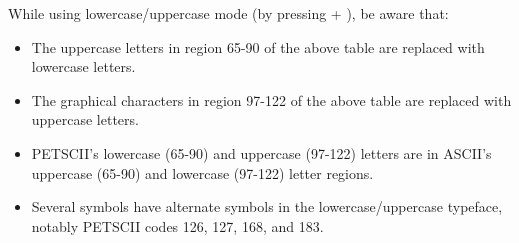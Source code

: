While using lowercase/uppercase mode (by pressing \megasymbolkey + ), be aware that:
\begin{itemize}
  \item The uppercase letters in region 65-90 of the above table are replaced with lowercase letters.
  \item The graphical characters in region 97-122 of the above table are replaced with uppercase letters.
  \item PETSCII's lowercase (65-90) and uppercase (97-122) letters are in ASCII's uppercase (65-90) and lowercase (97-122) letter regions.
  \item Several symbols have alternate symbols in the lowercase/uppercase typeface, notably PETSCII codes 126, 127, 168, and 183.
\end{itemize}
